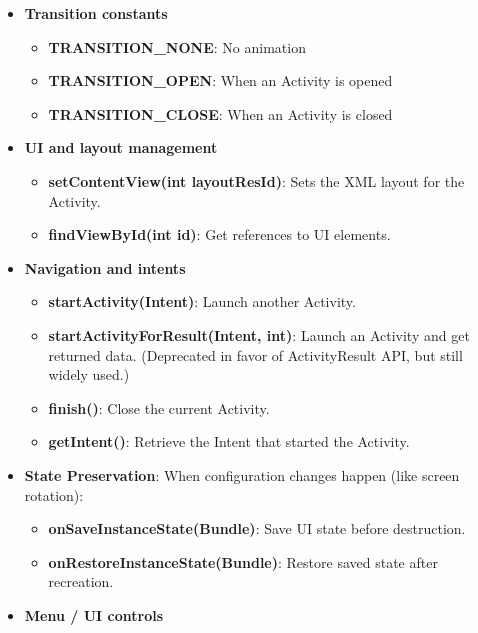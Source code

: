 \documentclass{report}
\begin{document}
\begin{itemize}
\begin{itemize}
            \end{itemize}
        \item \textbf{Transition constants}
            \begin{itemize}
                \item \textbf{TRANSITION\_NONE}:	No animation
                \item \textbf{TRANSITION\_OPEN}:	When an Activity is opened
                \item \textbf{TRANSITION\_CLOSE}:	When an Activity is closed
            \end{itemize}
        \item  \textbf{UI and layout management}
            \begin{itemize}
                \item \textbf{setContentView(int layoutResId)}:	Sets the XML layout for the Activity.
                \item \textbf{findViewById(int id)}:	Get references to UI elements.
            \end{itemize}
        \item \textbf{Navigation and intents}
            \begin{itemize}
                \item \textbf{startActivity(Intent)}:	Launch another Activity.
                \item \textbf{startActivityForResult(Intent, int)}:	Launch an Activity and get returned data. (Deprecated in favor of ActivityResult API, but still widely used.)
                \item \textbf{finish()}:	Close the current Activity.
                \item \textbf{getIntent()}:	Retrieve the Intent that started the Activity.
            \end{itemize}
        \item \textbf{State Preservation}: When configuration changes happen (like screen rotation):
            \begin{itemize}
                \item \textbf{onSaveInstanceState(Bundle)}:	Save UI state before destruction.
                \item \textbf{onRestoreInstanceState(Bundle)}:	Restore saved state after recreation.
            \end{itemize}
        \item \textbf{Menu / UI controls}
            \begin{itemize}

\end{itemize}
\end{itemize}
\end{document}
